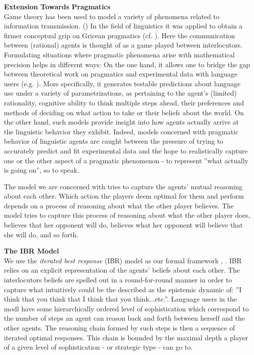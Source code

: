 \documentclass[10pt,a4paper]{article}
\begin{document}
\noindent \textbf{Extension Towards Pragmatics}\\
Game theory has been used to model a variety of phenomena related to information transmission. (\cite{spence1973job, smith1982evolution, cho1987signaling})
In the field of linguistics it was applied to obtain a firmer conceptual grip on Gricean pragmatics (cf. \cite{benz2006introduction, jager2007language}).
Here the communication between (rational) agents is thought of as a game played between interlocutors. Formulating situations where pragmatic phenomena arise with mathematical precision helps in different ways: On the one hand, it allows one to bridge the gap between theoretical work on pragmatics and experimental data with language users (e.g. \cite{frank2012predicting}). More specifically, it generates testable predictions about language use under a variety of parametrizations, as pertaining to the agent's (limited) rationality, cognitive ability to think multiple steps ahead, their preferences and methods of deciding on what action to take or their beliefs about the world. On the other hand, such models provide insight into how agents actually arrive at the linguistic behavior they exhibit.
Indeed, models concerned with pragmatic behavior of linguistic agents are caught between the pressure of trying to accurately predict and fit experimental data and the hope to realistically capture one or the other aspect of a pragmatic phenomenon - to represent ''what actually is going on'', so to speak.

The model we are concerned with tries to capture the agents' mutual reasoning about each other. Which action the players deem optimal for them and perform depends on a process of reasoning about what the other player believes. The model tries to capture this process of reasoning about what the other player does, believes that her opponent will do, believes what her opponent will believe that she will do, and so forth.

\noindent \textbf{The IBR Model}\\
We use the \textit{iterated best response} (IBR) model as our formal framework \cite{franke2009signal}, \cite{franke2014pragmatic}. IBR relies on an explicit representation of the agents' beliefs about each other. The interlocutors beliefs are spelled out in a round-for-round manner in order to capture what intuitively could be the described as the epistemic dynamic of: ''I think that you think that I think that you think...etc.''. Language users in the modl have some hierarchically ordered level of sophistication which correspond to the number of steps an agent can reason back and forth between herself and the other agents. The reasoning chain formed by such steps is then a sequence of iterated optimal responses. This chain is bounded by the maximal depth a player of a given level of sophistication - or strategic type - can go to.
\end{document}
